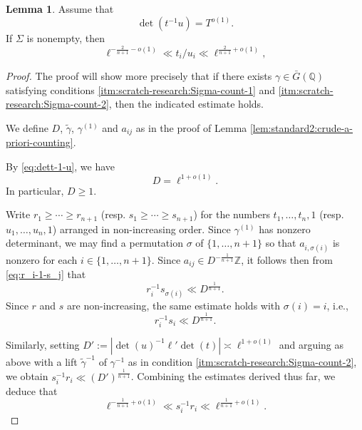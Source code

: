 \documentclass[reqno]{amsart}
\theoremstyle{plain} \newtheorem{theorem} {Theorem}
\theoremstyle{definition} \newtheorem{definition} [theorem] {Definition}
\theoremstyle{itplain} %
\newtheorem{lemma}[theorem]{Lemma}
\numberwithin{equation}{section}
\numberwithin{theorem}{section}
\renewcommand{\geq}{\geqslant}
\begin{document}
\begin{lemma}\label{lem:scratch-research:if-sigma-nonempty}
  Assume that
  \begin{equation}\label{eq:dett-1-u}
    \det(t^{-1} u) = T^{o(1)}.
  \end{equation}
  If $\Sigma$  is nonempty, then
  \begin{equation}\label{eq:d--frac2n+1-0}
    \ell^{-\frac{2}{n+1} - o(1)} \ll t_i / u_i \ll \ell^{\frac{2}{n+1}+o(1)},
  \end{equation}
\end{lemma}
\begin{proof}
  The proof will show more precisely that if there exists $\gamma \in \bar{G}(\mathbb{Q})$ satisfying conditions \eqref{itm:scratch-research:Sigma-count-1} and \eqref{itm:scratch-research:Sigma-count-2}, then the indicated estimate holds.

  We define $D$, $\tilde{\gamma}$, $\gamma^{(1)}$ and $a_{i j}$ as in the proof of Lemma \ref{lem:standard2:crude-a-priori-counting}.

  By \eqref{eq:dett-1-u}, we have
  \begin{equation}\label{eq:d-=-ell1}
    D = \ell^{1 + o(1)}.
  \end{equation}
  In particular, $D \geq 1$.
  
  Write $r_1 \geq \dotsb \geq r_{n+1}$ (resp. $s_1 \geq \dotsb \geq s_{n+1}$) for the numbers $t_1,\dotsc,t_n,1$ (resp. $u_1,\dotsc,u_n,1$) arranged in non-increasing order.  Since $\gamma^{(1)}$ has nonzero determinant, we may find a permutation $\sigma$ of $\{1, \dotsc, n+1\}$ so that $a_{i,\sigma(i)}$ is nonzero for each $i \in \{1, \dotsc, n+1\}$.  Since $a_{i j} \in D^{- \frac{1}{n+1}} \mathbb{Z}$, it follows then from \eqref{eq:r_i-1-s_j} that
  \begin{equation}\label{eq:r_i-1-s_sigmai}
    r_i^{-1} s_{\sigma(i)} \ll D ^{\frac{1}{n+1}}.
  \end{equation}
  Since $r$ and $s$ are non-increasing, the same estimate holds with $\sigma(i) = i$, i.e.,
  \begin{equation}\label{eq:r_i-1-s_i}
    r_i^{-1} s_i \ll D ^{\frac{1}{n+1}}.
  \end{equation}

  Similarly, setting $D' := |\det(u)^{-1} \ell ' \det(t)| \asymp \ell^{1+o(1)}$ and arguing as above with a lift $\tilde{\gamma}^{-1}$ of $\gamma^{-1}$ as in condition \eqref{itm:scratch-research:Sigma-count-2}, we obtain $s_i^{-1} r_i \ll (D') ^{\frac{1}{n+1}}$.  Combining the estimates derived thus far, we deduce that
  \begin{equation}\label{eq:ell--frac1n+1}
    \ell ^{- \frac{1}{n+1} + o(1)} \ll s_i^{-1} r_i \ll \ell ^{\frac{1}{n+1} + o(1)}.
  \end{equation}


\end{proof}
\end{document}
